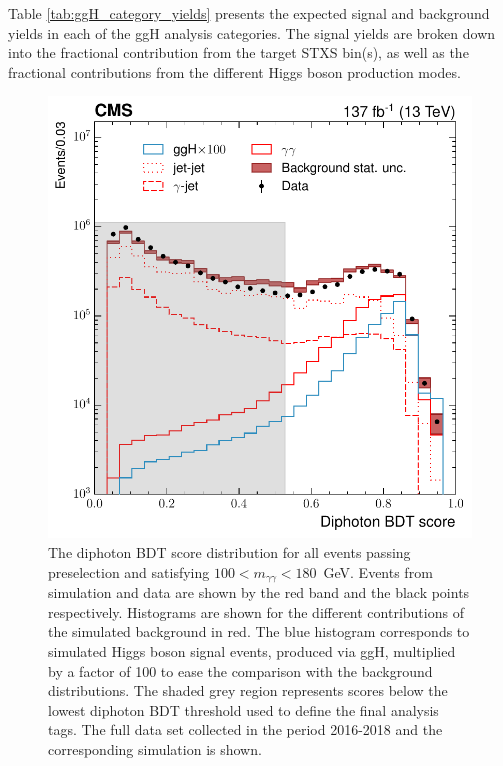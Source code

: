 Table \ref{tab:ggH_category_yields} presents the expected signal and background yields in each of the ggH analysis categories. The signal yields are broken down into the fractional contribution from the target STXS bin(s), as well as the fractional contributions from the different Higgs boson production modes.

\begin{figure}[htb!]
  \centering
  \includegraphics[width=.5\textwidth]{Figures/hgg_overview/DiphoBDT_dipho_mva_logPlot_noStack.pdf}
  \caption[Diphoton BDT output distribution]
  {
    The diphoton BDT score distribution for all events passing preselection and satisfying $100<m_{\gamma\gamma}<180$~GeV. Events from simulation and data are shown by the red band and the black points respectively. Histograms are shown for the different contributions of the simulated background in red. The blue histogram corresponds to simulated Higgs boson signal events, produced via ggH, multiplied by a factor of 100 to ease the comparison with the background distributions. The shaded grey region represents scores below the lowest diphoton BDT threshold used to define the final analysis tags. The full data set collected in the period 2016-2018 and the corresponding simulation is shown.
  }
  \label{fig:diphoton_score}
\end{figure}

